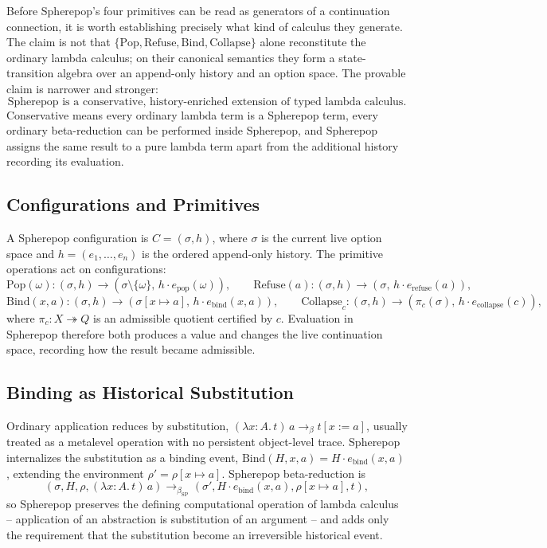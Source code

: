 \documentclass[11pt]{article}
\newcommand{\Pop}{\mathrm{Pop}}
\newcommand{\Refuse}{\mathrm{Refuse}}
\newcommand{\Bind}{\mathrm{Bind}}
\newcommand{\Collapse}{\mathrm{Collapse}}
\begin{document}
Before Spherepop's four primitives can be read as generators of a continuation connection, it is worth establishing precisely what kind of calculus they generate. The claim is not that $\{\Pop, \Refuse, \Bind, \Collapse\}$ alone reconstitute the ordinary lambda calculus; on their canonical semantics they form a state-transition algebra over an append-only history and an option space. The provable claim is narrower and stronger:
\[
\text{Spherepop is a conservative, history-enriched extension of typed lambda calculus.}
\]
Conservative means every ordinary lambda term is a Spherepop term, every ordinary beta-reduction can be performed inside Spherepop, and Spherepop assigns the same result to a pure lambda term apart from the additional history recording its evaluation.

\subsection{Configurations and Primitives}

A Spherepop configuration is $C = (\sigma, h)$, where $\sigma$ is the current live option space and $h = (e_1, \ldots, e_n)$ is the ordered append-only history. The primitive operations act on configurations:
\[
\Pop(\omega) : (\sigma, h) \to (\sigma \setminus \{\omega\},\, h \cdot e_{\mathrm{pop}}(\omega)), \qquad
\Refuse(a) : (\sigma, h) \to (\sigma,\, h \cdot e_{\mathrm{refuse}}(a)),
\]
\[
\Bind(x,a) : (\sigma, h) \to (\sigma[x \mapsto a],\, h \cdot e_{\mathrm{bind}}(x,a)), \qquad
\Collapse_c : (\sigma, h) \to (\pi_c(\sigma),\, h \cdot e_{\mathrm{collapse}}(c)),
\]
where $\pi_c : X \twoheadrightarrow Q$ is an admissible quotient certified by $c$. Evaluation in Spherepop therefore both produces a value and changes the live continuation space, recording how the result became admissible.

\subsection{Binding as Historical Substitution}

Ordinary application reduces by substitution, $(\lambda x{:}A.\,t)\,a \longrightarrow_\beta t[x:=a]$, usually treated as a metalevel operation with no persistent object-level trace. Spherepop internalizes the substitution as a binding event, $\Bind(H,x,a) = H \cdot e_{\mathrm{bind}}(x,a)$, extending the environment $\rho' = \rho[x \mapsto a]$. Spherepop beta-reduction is
\[
(\sigma, H, \rho, (\lambda x{:}A.\,t)\,a) \longrightarrow_{\beta_{\mathrm{SP}}} (\sigma', H \cdot e_{\mathrm{bind}}(x,a), \rho[x\mapsto a], t),
\]
so Spherepop preserves the defining computational operation of lambda calculus -- application of an abstraction is substitution of an argument -- and adds only the requirement that the substitution become an irreversible historical event.
\end{document}
